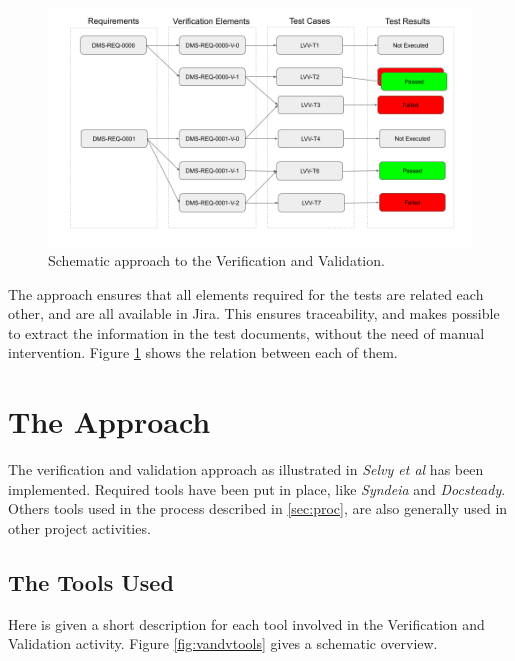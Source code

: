 \begin{figure}
\begin{center}
\includegraphics[width=\textwidth]{imgs/VandVSchema.png}
 \caption{Schematic approach to the Verification and Validation.}
 \label{fig:vandvschema}
\end{center}
\end{figure}

The approach ensures that all elements required for the tests are related each other, and are all available in Jira.
This ensures traceability, and makes possible to extract the information in the test documents, without the need of manual intervention.
Figure \ref{fig:vandvschema} shows the relation between each of them.


\section{The Approach}

The verification and validation approach as illustrated in  \textit{Selvy et al}\cite{10.1117/12.2310125}  has been implemented.
Required tools have been put in place, like \textit{Syndeia} and \textit{Docsteady}.
Others tools used in the process described in \ref{sec:proc}, are also generally used in other project activities. 


\subsection{The Tools Used}

Here is given a short description for each tool involved in the Verification and Validation activity.
Figure \ref{fig:vandvtools} gives a schematic overview.

